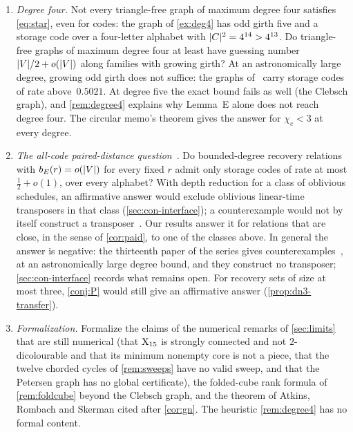 \begin{enumerate}[label=\arabic*.,leftmargin=2em]
\item \emph{Degree four.} Not every triangle-free graph of maximum degree four satisfies \eqref{eq:star}, even for codes:
the graph of \cref{ex:deg4} has odd girth five and a storage code over a four-letter alphabet with
$\lvert C \rvert^2=4^{14}>4^{13}$. Do triangle-free graphs of maximum degree four at least have guessing number
$\lvert V \rvert/2+o(\lvert V \rvert)$ along families with growing girth? At an astronomically large degree, growing odd girth does not
suffice: the graphs of~\cite[Corollary~U]{StorageCodes2026} carry storage codes of rate above~$0.5021$. At degree five
the exact bound fails as well (the Clebsch graph),
and \cref{rem:degree4} explains why Lemma~E alone does not reach degree four. The circular memo's theorem gives
the answer for $\chi_c<3$ at every degree.

\item \emph{The all-code paired-distance question}~\cite[Question~9.1]{DirectedRecovery2026}. Do bounded-degree
recovery relations with $b_E(r)=o(\lvert V \rvert)$ for every fixed $r$ admit only storage codes of rate at most
$\frac12+o(1)$, over every alphabet? With depth reduction for a class of oblivious schedules, an affirmative answer would
exclude oblivious linear-time transposers in that class (\cref{sec:con-interface}); a counterexample would not by itself
construct a transposer~\cite{DirectedRecovery2026}. Our results answer it for relations that are close, in the sense of
\cref{cor:paid}, to one of the classes above. In general the answer is negative: the thirteenth paper of the series gives
counterexamples~\cite[Theorem~A and Corollary~A$'$]{StorageCodes2026}, at an astronomically large degree bound, and they
construct no transposer; \cref{sec:con-interface} records what remains open. For recovery sets of size at most three,
\cref{conj:P} would still give an affirmative answer (\cref{prop:dn3-transfer}).

\item \emph{Formalization.} Formalize the claims of the numerical remarks of \cref{sec:limits} that are still
numerical (that $\mathrm{X}_{15}$ is strongly connected and not $2$-dicolourable and that its minimum nonempty core is not a
piece, that the twelve chorded cycles of \cref{rem:sweeps} have no valid sweep, and that the Petersen graph has no global
certificate), the folded-cube rank formula of \cref{rem:foldcube} beyond the Clebsch graph, and the theorem of Atkins,
Rombach and Skerman cited after \cref{cor:gn}. The heuristic \cref{rem:degree4} has no formal content.
\end{enumerate}
